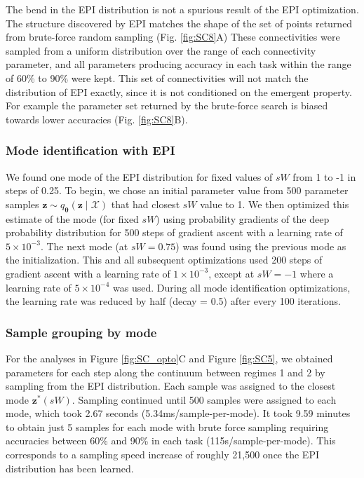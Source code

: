\documentclass[11pt]{article}
\begin{document}
The bend in the EPI distribution is not a spurious result of the EPI optimization.
The structure discovered by EPI matches the shape of the set of points returned from brute-force random sampling (Fig. \ref{fig:SC8}A) 
These connectivities were sampled from a uniform distribution over the range of each connectivity parameter, and all parameters producing accuracy in each task within the range of 60\% to 90\% were kept.
This set of connectivities will not match the distribution of EPI exactly, since it is not conditioned on the emergent property.
For example the parameter set returned by the brute-force search is biased towards lower accuracies (Fig. \ref{fig:SC8}B).


\subsubsection{Mode identification with EPI} \label{methods_sc_regime}
We found one mode of the EPI distribution for fixed values of $sW$ from 1 to -1 in steps of 0.25.
To begin, we chose an initial parameter value from 500 parameter samples $\mathbf{z} \sim q_{\bm{\theta}}(\mathbf{z} \mid \mathcal{X})$ that had closest $sW$ value to 1.
We then optimized this estimate of the mode (for fixed $sW$) using probability gradients of the deep probability distribution for 500 steps of gradient ascent with a learning rate of $5 \times 10^{-3}$.
The next mode (at $sW = 0.75$) was found using the previous mode as the initialization.
This and all subsequent optimizations used 200 steps of gradient ascent with a learning rate of $1 \times 10^{-3}$, except at $sW = -1$ where a learning rate of $5 \times 10^{-4}$ was used.
During all mode identification optimizations, the learning rate was reduced by half (decay = 0.5) after every 100 iterations.

\subsubsection{Sample grouping by mode} \label{methods_sc_group}
For the analyses in Figure \ref{fig:SC_opto}C and Figure \ref{fig:SC5}, we obtained parameters for each step along the continuum between regimes 1 and 2 by sampling from the EPI distribution.
Each sample was assigned to the closest mode $\mathbf{z}^*(sW)$.
Sampling continued until 500 samples were assigned to each mode, which took 2.67 seconds (5.34ms/sample-per-mode).
It took 9.59 minutes to obtain just 5 samples for each mode with brute force sampling requiring accuracies between 60\% and 90\% in each task (115s/sample-per-mode).
This corresponds to a sampling speed increase of roughly 21,500 once the EPI distribution has been learned.
\end{document}
